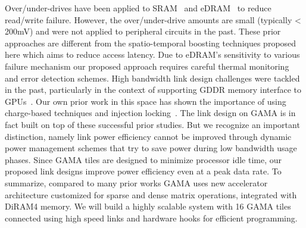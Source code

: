 Over/under-drives have been applied to SRAM~\cite{7046972, 6176988} and eDRAM~\cite{6757412} to reduce read/write failure. However, the over/under-drive amounts are small (typically < 200mV) and were not applied to  peripheral circuits in the past. These prior approaches are different from the spatio-temporal boosting techniques proposed here which aims to reduce access latency. Due to eDRAM's sensitivity to various failure mechanism our proposed approach requires careful thermal monitoring and error detection schemes. High bandwidth link design challenges were tackled in the past, particularly in the context of supporting GDDR memory interface to GPUs~\cite{partovi2009single, kho201075}. Our own prior work in this space has shown the importance of using charge-based techniques and injection locking~\cite{saxena20152, elkholy201610}. The link design on GAMA is in fact built on top of these successful prior studies. But we recognize an important distinction, namely link power efficiency cannot be improved through dynamic power management schemes that try to save power during low bandwidth usage phases.   Since GAMA tiles are designed to minimize processor idle time,  our proposed link designs improve power efficiency even at a peak data rate. To summarize, compared to many prior works  GAMA uses  new accelerator architecture customized for sparse and dense  matrix operations,  integrated with DiRAM4 memory. We will build a highly scalable system with 16 GAMA tiles connected using high speed links and hardware hooks for efficient programming.  



\begin{comment}
Various spatio-temporal voltage boosting techniques have been applied to SRAM to reduce read/write failure of SRAM arrays at low voltage~\cite{}, 
while the failure mechanism of eDRAM arrays singificantly differs from that of SRAM arrays.
That is, such voltage boosting techniques have never been applied to eDRAM arrays especially to reduce the access latency.
\end{comment}


